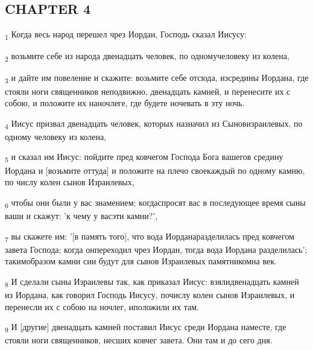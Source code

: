 \subsection{CHAPTER 4}
\begin{tcolorbox}
\textsubscript{1} Когда весь народ перешел чрез Иордан, Господь сказал Иисусу:
\end{tcolorbox}
\begin{tcolorbox}
\textsubscript{2} возьмите себе из народа двенадцать человек, по одномучеловеку из колена,
\end{tcolorbox}
\begin{tcolorbox}
\textsubscript{3} и дайте им повеление и скажите: возьмите себе отсюда, изсредины Иордана, где стояли ноги священников неподвижно, двенадцать камней, и перенесите их с собою, и положите их наночлеге, где будете ночевать в эту ночь.
\end{tcolorbox}
\begin{tcolorbox}
\textsubscript{4} Иисус призвал двенадцать человек, которых назначил из Сыновизраилевых, по одному человеку из колена,
\end{tcolorbox}
\begin{tcolorbox}
\textsubscript{5} и сказал им Иисус: пойдите пред ковчегом Господа Бога вашегов средину Иордана и [возьмите оттуда] и положите на плечо своекаждый по одному камню, по числу колен сынов Израилевых,
\end{tcolorbox}
\begin{tcolorbox}
\textsubscript{6} чтобы они были у вас знамением; когдаспросят вас в последующее время сыны ваши и скажут: 'к чему у васэти камни?',
\end{tcolorbox}
\begin{tcolorbox}
\textsubscript{7} вы скажете им: '[в память того], что вода Иорданаразделилась пред ковчегом завета Господа; когда онпереходил чрез Иордан, тогда вода Иордана разделилась'; такимобразом камни сии будут для сынов Израилевых памятникомна век.
\end{tcolorbox}
\begin{tcolorbox}
\textsubscript{8} И сделали сыны Израилевы так, как приказал Иисус: взялидвенадцать камней из Иордана, как говорил Господь Иисусу, почислу колен сынов Израилевых, и перенесли их с собою на ночлег, иположили их там.
\end{tcolorbox}
\begin{tcolorbox}
\textsubscript{9} И [другие] двенадцать камней поставил Иисус среди Иордана наместе, где стояли ноги священников, несших ковчег завета. Они там и до сего дня.
\end{tcolorbox}
